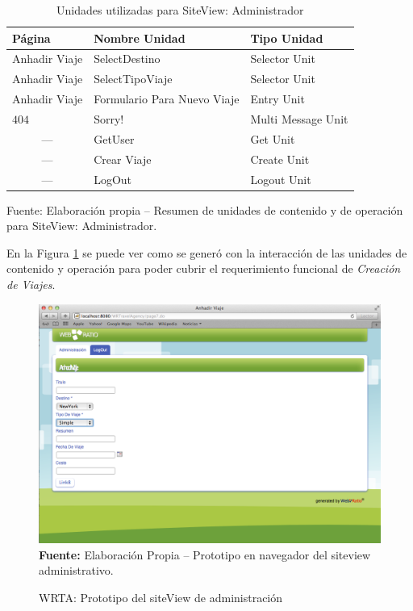 \documentclass[oneside,12pt,a4paper]{memoir}%
\begin{document}
			\begin{table}[htbp]
			\centering
			\caption{Unidades utilizadas para SiteView: Administrador}
				\begin{tabular}{|l|l|l|}
					\hline
					\textbf{P\'agina}	&	\textbf{Nombre Unidad}	&	\textbf{Tipo Unidad}\\\hline 
					Anhadir Viaje		&	SelectDestino			&	Selector Unit\\\hline
					Anhadir Viaje		&	SelectTipoViaje			&	Selector Unit\\\hline 
					Anhadir Viaje		&	Formulario Para Nuevo Viaje&	Entry Unit\\\hline 
					$404$				&	Sorry!					&	Multi Message Unit\\\hline 
					\multicolumn{1}{|c|}{---}&	GetUser				&	Get Unit	\\\hline
					\multicolumn{1}{|c|}{---}&	Crear Viaje			&	Create Unit	\\\hline
					\multicolumn{1}{|c|}{---}&	LogOut				&	Logout Unit	\\\hline
				\end{tabular}
			\newline
			Fuente: Elaboraci\'on propia -- Resumen de unidades de contenido y de
			operaci\'on para SiteView: Administrador.
			\label{tab:svAdministrador}
			\end{table}
			
			
			En la Figura \ref{fig:WRTA_paginaAdministrador} se puede ver como se
			gener\'o con la interacci\'on de las unidades de contenido y operaci\'on 
			para poder cubrir el requerimiento funcional de \textit{Creaci\'on de
			Viajes}.

			
			\begin{figure}[here]
				\centering
				\caption{WRTA: Prototipo del siteView de administraci\'on}
				\includegraphics[width=1.0\textwidth]{figure/fig_WRTA_Administracion.png}
				\newline
				\textbf{Fuente:} Elaboraci\'on Propia -- Prototipo en navegador del
				siteview administrativo.
				\label{fig:WRTA_paginaAdministrador}
			\end{figure}
			
\end{document}
